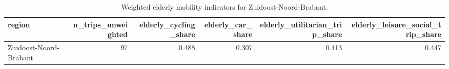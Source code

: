 \begin{table}
\caption{Weighted elderly mobility indicators for Zuidoost-Noord-Brabant.}
\label{tab:elderly_regional_mobility}
\begin{tabular}{lrrrrr}
\toprule
region & n\_trips\_unweighted & elderly\_cycling\_share & elderly\_car\_share & elderly\_utilitarian\_trip\_share & elderly\_leisure\_social\_trip\_share \\
\midrule
Zuidoost-Noord-Brabant & 97 & 0.488 & 0.307 & 0.413 & 0.447 \\
\bottomrule
\end{tabular}
\end{table}
